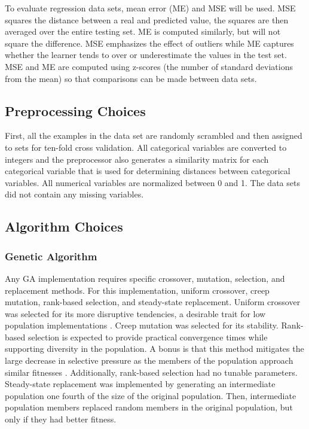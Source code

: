 \documentclass[twoside,11pt]{article}
\begin{document}
	To evaluate regression data sets, mean error (ME) and MSE will be used. MSE squares the distance between a real and predicted value, the squares are then averaged over the entire testing set. 
	ME is computed similarly, but will not square the difference. MSE emphasizes the effect of outliers while ME captures whether the learner tends to over or underestimate the values in the test set. 
	MSE and ME are computed using z-scores (the number of standard deviations from the mean) so that comparisons can be made between data sets.

\subsection{Preprocessing Choices}

	First, all the examples in the data set are randomly scrambled and then assigned to sets for ten-fold cross validation. 
	All categorical variables are converted to integers 
	and the preprocessor also generates a similarity matrix for each categorical variable that is used for determining distances between categorical variables. 
	All numerical variables are normalized between 0 and 1. 
	The data sets did not contain any missing variables.

\subsection{Algorithm Choices}

\subsubsection{Genetic Algorithm}

	Any GA implementation requires specific crossover, mutation, selection, and replacement methods. For this implementation, uniform crossover, creep mutation, rank-based selection, and steady-state replacement. Uniform crossover was selected for its more disruptive tendencies, a desirable trait for low population implementations \citep{ga_tutorial}. Creep mutation was selected for its stability. Rank-based selection is expected to provide practical convergence times while supporting diversity in the population. A bonus is that this method mitigates the large decrease in selective pressure as the members of the population approach similar fitnesses \citep{ga_tutorial}. Additionally, rank-based selection had no tunable parameters. Steady-state replacement was implemented by generating an intermediate population one fourth of the size of the original population. Then, intermediate population members replaced random members in the original population, but only if they had better fitness.	
\end{document}
